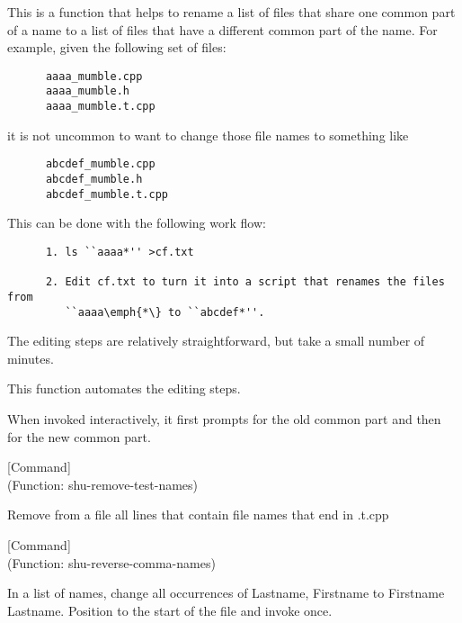 \begin{doc-string}
This is a function that helps to rename a list of files that share one common
part of a name to a list of files that have a different common part of the name.
For example, given the following set of files:

\small{\begin{verbatim}
      aaaa_mumble.cpp
      aaaa_mumble.h
      aaaa_mumble.t.cpp
\end{verbatim}}

it is not uncommon to want to change those file names to something like

\small{\begin{verbatim}
      abcdef_mumble.cpp
      abcdef_mumble.h
      abcdef_mumble.t.cpp
\end{verbatim}}

This can be done with the following work flow:

\small{\begin{verbatim}
      1. ls ``aaaa*'' >cf.txt

      2. Edit cf.txt to turn it into a script that renames the files from
         ``aaaa\emph{*\} to ``abcdef*''.
\end{verbatim}}

The editing steps are relatively straightforward, but take a small number of
minutes.

This function automates the editing steps.

When invoked interactively, it first prompts for the old common part and then
for the new common part.
\end{doc-string}

\vspace{1em}
\noindent
{}
\usebox{\funcname}
 \hfill [Command]\\%
 (Function: shu-remove-test-names)

\begin{doc-string}
Remove from a file all lines that contain file names that end in .t.cpp
\end{doc-string}

\vspace{1em}
\noindent
{}
\usebox{\funcname}
 \hfill [Command]\\%
 (Function: shu-reverse-comma-names)

\begin{doc-string}
In a list of names, change all occurrences
of Lastname, Firstname to Firstname Lastname.
Position to the start of the file and invoke once.
\end{doc-string}

